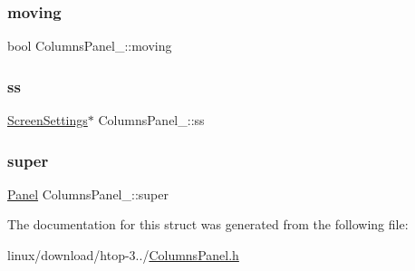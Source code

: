 \subsubsection{\texorpdfstring{moving}{moving}}
{\footnotesize\ttfamily bool Columns\+Panel\+\_\+\+::moving}

\mbox{\label{structColumnsPanel___a71eafb37d8e727f04ac9362feb5b4c37}} 
\subsubsection{\texorpdfstring{ss}{ss}}
{\footnotesize\ttfamily \hyperlink{Settings_8h_a86d3dc963e563d775d50b8cc2b77afb8}{Screen\+Settings}$\ast$ Columns\+Panel\+\_\+\+::ss}

\mbox{\label{structColumnsPanel___a80835db4cb32e37ad1125b5b5f66667d}} 
\subsubsection{\texorpdfstring{super}{super}}
{\footnotesize\ttfamily \hyperlink{Panel_8h_a034d4c16521db412dc7a1e8536d16fae}{Panel} Columns\+Panel\+\_\+\+::super}



The documentation for this struct was generated from the following file\+:\begin{DoxyCompactItemize}
\item 
linux/download/htop-\/3../\hyperlink{ColumnsPanel_8h}{Columns\+Panel.\+h}\end{DoxyCompactItemize}
